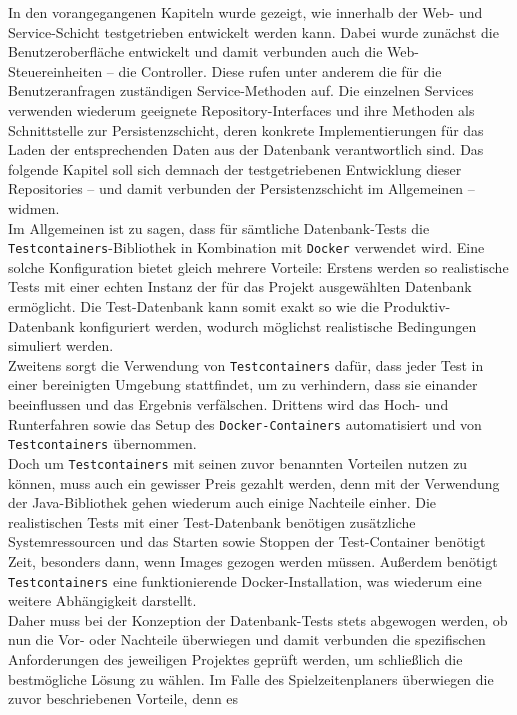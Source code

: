
In den vorangegangenen Kapiteln wurde gezeigt, wie innerhalb der Web- und 
Service-Schicht testgetrieben entwickelt werden kann. Dabei wurde zunächst die 
Benutzeroberfläche entwickelt und damit verbunden auch die Web-Steuereinheiten -- 
die Controller. Diese rufen unter anderem die für die Benutzeranfragen zuständigen 
Service-Methoden auf. Die einzelnen Services verwenden wiederum geeignete 
Repository-Interfaces und ihre Methoden als Schnittstelle zur Persistenzschicht, deren 
konkrete Implementierungen für das Laden der entsprechenden Daten aus der Datenbank 
verantwortlich sind. Das folgende Kapitel soll sich demnach der testgetriebenen 
Entwicklung dieser Repositories -- und damit verbunden der Persistenzschicht im 
Allgemeinen -- widmen. \\ 
Im Allgemeinen ist zu sagen, dass für sämtliche Datenbank-Tests die 
\texttt{Testcontainers}-Bibliothek in Kombination mit \texttt{Docker} verwendet wird. 
Eine solche Konfiguration bietet gleich mehrere Vorteile: Erstens werden so 
realistische Tests mit einer echten Instanz der für das Projekt ausgewählten 
Datenbank ermöglicht. Die Test-Datenbank kann somit exakt so wie die 
Produktiv-Datenbank konfiguriert werden, wodurch möglichst realistische Bedingungen 
simuliert werden. \\ 
Zweitens sorgt die Verwendung von \texttt{Testcontainers} dafür, dass jeder Test in 
einer bereinigten Umgebung stattfindet, um zu verhindern, dass sie einander 
beeinflussen und das Ergebnis verfälschen. Drittens wird das Hoch- und Runterfahren 
sowie das Setup des \texttt{Docker-Containers} automatisiert und von 
\texttt{Testcontainers} übernommen. \\ 
Doch um \texttt{Testcontainers} mit seinen zuvor benannten Vorteilen nutzen zu können, 
muss auch ein gewisser Preis gezahlt werden, denn mit der Verwendung der Java-Bibliothek 
gehen wiederum auch einige Nachteile einher. Die realistischen Tests mit einer 
Test-Datenbank benötigen zusätzliche Systemressourcen und das Starten sowie Stoppen der
Test-Container benötigt Zeit, besonders dann, wenn Images gezogen werden müssen. 
Außerdem benötigt \texttt{Testcontainers} eine funktionierende Docker-Installation, was 
wiederum eine weitere Abhängigkeit darstellt. \\ 
Daher muss bei der Konzeption der Datenbank-Tests stets abgewogen werden, ob nun die 
Vor- oder Nachteile überwiegen und damit verbunden die spezifischen Anforderungen des 
jeweiligen Projektes geprüft werden, um schließlich die bestmögliche Lösung zu wählen. 
Im Falle des Spielzeitenplaners überwiegen die zuvor beschriebenen Vorteile, denn es 
